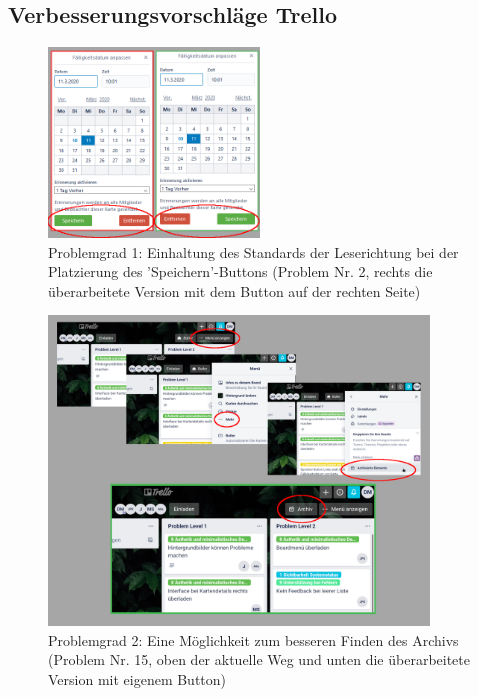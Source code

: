 \subsection{Verbesserungsvorschläge Trello}
\FloatBarrier
\begin{figure}[h]
    \includegraphics[width=0.5\textwidth]{images/Verbesserungsvorschlaege/1 TrelloDatepicker.PNG}
    \centering
    \caption{Problemgrad 1: Einhaltung des Standards der Leserichtung bei der Platzierung des 'Speichern'-Buttons (Problem Nr. 2, rechts die überarbeitete Version mit dem Button auf der rechten Seite)}
    \label{fig:datepicker}
\end{figure}

\begin{figure}[h]
    \includegraphics[width=0.9\textwidth]{images/Verbesserungsvorschlaege/2 Archiv.PNG}
    \centering
    \caption{Problemgrad 2: Eine Möglichkeit zum besseren Finden des Archivs (Problem Nr. 15, oben der aktuelle Weg und unten die überarbeitete Version mit eigenem Button)}
    \label{fig:archiv}
\end{figure}

